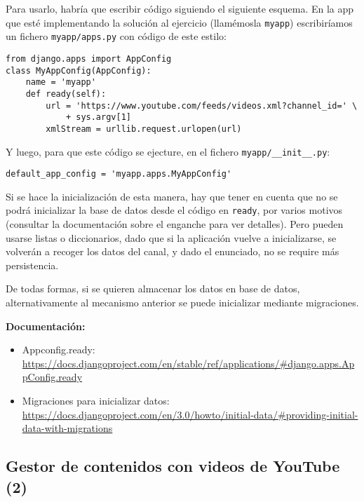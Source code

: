 Para usarlo, habría que escribir código siguiendo el siguiente esquema. En la app que esté implementando la solución al ejercicio (llamémosla \verb|myapp|) escribiríamos un fichero \verb|myapp/apps.py| con código de este estilo:

\begin{verbatim}
from django.apps import AppConfig
class MyAppConfig(AppConfig):
    name = 'myapp'
    def ready(self):
        url = 'https://www.youtube.com/feeds/videos.xml?channel_id=' \
            + sys.argv[1]
        xmlStream = urllib.request.urlopen(url)
\end{verbatim}

Y luego, para que este código se ejecture, en el fichero \verb|myapp/__init__.py|:

\begin{verbatim}
default_app_config = 'myapp.apps.MyAppConfig'
\end{verbatim}

Si se hace la inicialización de esta manera, hay que tener en cuenta que no se podrá inicializar la base de datos desde el código en \verb|ready|, por varios motivos (consultar la documentación sobre el enganche para ver detalles). Pero pueden usarse listas o diccionarios, dado que si la aplicación vuelve a inicializarse, se volverán a recoger los datos del canal, y dado el enunciado, no se require más persistencia.

De todas formas, si se quieren almacenar los datos en base de datos, alternativamente al mecanismo anterior se puede inicializar mediante migraciones.

\textbf{Documentación:}

\begin{itemize}
\item Appconfig.ready: \\
\url{https://docs.djangoproject.com/en/stable/ref/applications/#django.apps.AppConfig.ready}

\item Migraciones para inicializar datos: \\
\url{https://docs.djangoproject.com/en/3.0/howto/initial-data/#providing-initial-data-with-migrations}
\end{itemize}

\subsection{Gestor de contenidos con videos de YouTube (2)}
\label{subsec:django-cms-youtube-2}

